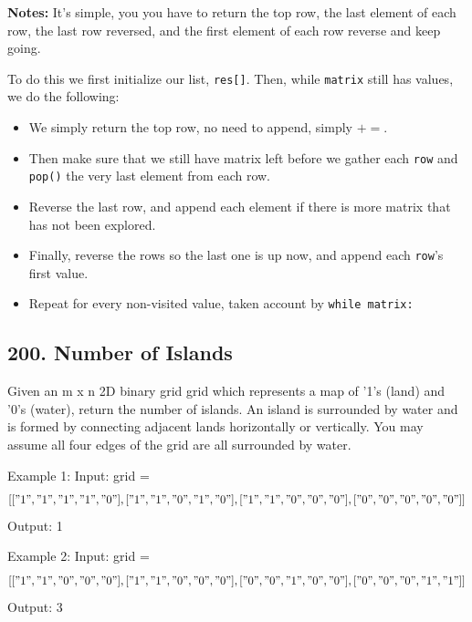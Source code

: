 \documentclass[11pt]{article}
\begin{document}
\noindent \textbf{Notes:} It's simple, you you have to return the top row, the last element of each row, the last row reversed, and the first element of each row reverse and keep going.

\noindent To do this we first initialize our list, \texttt{res[]}. Then, while \texttt{matrix} still has values, we do the following:

\begin{itemize}
    \item We simply return the top row, no need to append, simply $+=$.
    \item Then make sure that we still have matrix left before we gather each \texttt{row} and \texttt{pop()} the very last element from each row. 
    \item Reverse the last row, and append each element if there is more matrix that has not been explored.
    \item Finally, reverse the rows so the last one is up now, and append each \texttt{row}'s first value.
    \item Repeat for every non-visited value, taken account by \texttt{while matrix:}
\end{itemize}

\subsection*{200. Number of Islands}
Given an m x n 2D binary grid grid which represents a map of '1's (land) and '0's (water), return the number of islands. An island is surrounded by water and is formed by connecting adjacent lands horizontally or vertically. You may assume all four edges of the grid are all surrounded by water.

 

\noindent Example 1:
Input: grid = $$[
  ["1","1","1","1","0"],
  ["1","1","0","1","0"],
  ["1","1","0","0","0"],
  ["0","0","0","0","0"]
] $$
\noindent Output: 1

\noindent Example 2:
Input: grid =  $$[
  ["1","1","0","0","0"],
  ["1","1","0","0","0"],
  ["0","0","1","0","0"],
  ["0","0","0","1","1"]
] $$
Output: 3
\end{document}
